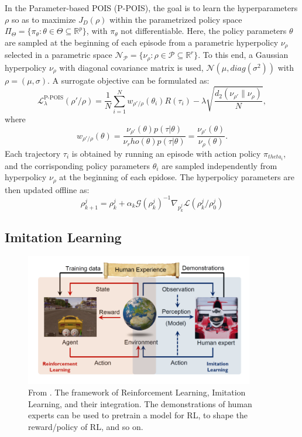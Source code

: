In the Parameter-based POIS (P-POIS), the goal is to learn the hyperparameters $\rho$ so as to maximize $J_D(\rho)$ within the parametrized policy space $\Pi_\Theta=\{\pi_\theta:\theta \in \Theta \subseteq \mathbb{R}^p\}$, with $\pi_\theta$ not differentiable. Here, the policy parameters $\theta$ are sampled at the beginning of each episode from a parametric hyperpolicy $\nu_\rho$ selected in a parametric space \(\mathcal{N}_\mathcal{P} = \{\nu_\rho:\rho \in \mathcal{P} \subseteq \mathbb{R}^r\}\).
To this end, a Gaussian hyperpolicy $\nu_\rho$ with diagonal covariance matrix is used, $\mathcal{N}(\mu,diag(\sigma^2))$ with $\rho=(\mu,\sigma)$.
A surrogate objective can be formulated as: \[\mathcal{L}_\lambda^{\text{P-POIS}}(\rho'/\rho)=\frac{1}{N} \sum^N_{i=1}w_{\rho'/\rho}(\theta_i)R(\tau_i)-\lambda\sqrt{\frac{d_2(\nu_{\rho'}\|\nu_\rho)}{N}},\] where \[w_{\rho'/\rho}(\theta)=\frac{\nu_{\rho'}(\theta)p(\tau|\theta)}{\nu_rho(\theta)p(\tau|\theta)}=\frac{\nu_{\rho'}(\theta)}{\nu_\rho(\theta)}.\]
Each trajectory $\tau_i$ is obtained by running an episode with action policy $\pi_{theta_i}$, and the corrisponding policy parameters $\theta_i$ are sampled independently from hyperpolicy $\nu_\rho$ at the beginning of each epidose. The hyperpolicy parameters are then updated offline as: \[\rho^j_{k+1}=\rho^j_k+\alpha_k\mathcal{G}(\rho_k^j)^{-1}\nabla_{p_k^j}\mathcal{L}(\rho^j_k/\rho^j_0)\]





\subsection{Imitation Learning}
\begin{figure}[t]
 \centering
  \captionsetup{width=10cm}
  \includegraphics[width=10cm]{./img/cinesi}
  \caption{From \cite{cinesi}. The framework of Reinforcement Learning, Imitation Learning, and their integration. The demonstrations of human experts can be used to pretrain a model for RL, to shape the reward/policy of RL, and so on.}
   \label{fig:cinesi}
\end{figure}


